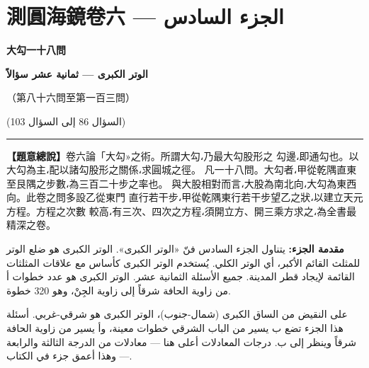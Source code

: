 \documentclass[11pt,a4paper]{article}
\newcommand{\ar}[1]{\arabicfont\beginR #1\endR}
\newcommand{\longline}{\noindent\rule{\textwidth}{0.4pt}}
\newcounter{probnum}
\begin{document}
\newpage

\setcounter{probnum}{0}

\section{測圓海鏡卷六 — \ar{الجزء السادس}}
\label{sec:vol6}

\begin{center}
{\Large\bfseries\color{volcolor} 大勾一十八問}

\vspace{0.2cm}

{\fontsize{14}{18}\selectfont\arabicfont\beginR\color{volcolor}\textbf{الوتر الكبرى — ثمانية عشر سؤالاً}\endR}

\vspace{0.2cm}

{\small\color{notecolor} （第八十六問至第一百三問）}

{\small\color{notecolor}\arabicfont\beginR (السؤال 86 إلى السؤال 103)\endR}
\end{center}

\vspace{0.3cm}
\longline
\vspace{0.3cm}

\noindent
\begin{minipage}[t]{0.48\textwidth}
\textbf{【題意總說】}卷六論「大勾»之術。所謂大勾،乃最大勾股形之
勾邊،即通勾也。以大勾為主،配以諸勾股形之關係،求圓城之徑。
凡一十八問。大勾者،甲從乾隅直東至艮隅之步數،為三百二十步之率也。
與大股相對而言،大股為南北向،大勾為東西向。此卷之問多設乙從東門
直行若干步،甲從乾隅東行若干步望乙之狀،以建立天元方程。方程之次數
較高،有三次、四次之方程،須開立方、開三乘方求之،為全書最精深之卷。
\end{minipage}
\hfill
\begin{minipage}[t]{0.48\textwidth}
\arabicfont\beginR
\textbf{مقدمة الجزء:} يتناول الجزء السادس فنّ «الوتر الكبرى».
الوتر الكبرى هو ضلع الوتر للمثلث القائم الأكبر، أي الوتر الكلي.
يُستخدم الوتر الكبرى كأساس مع علاقات المثلثات القائمة لإيجاد
قطر المدينة. جميع الأسئلة الثمانية عشر. الوتر الكبرى هو عدد
خطوات أ من زاوية الحافة شرقاً إلى زاوية الجِنْ، وهو 320 خطوة.

على النقيض من الساق الكبرى (شمال-جنوب)، الوتر الكبرى هو شرقي-غربي.
أسئلة هذا الجزء تضع ب يسير من الباب الشرقي خطوات معينة، وأ
يسير من زاوية الحافة شرقاً وينظر إلى ب. درجات المعادلات أعلى
هنا — معادلات من الدرجة الثالثة والرابعة — وهذا أعمق جزء في الكتاب.
\endR
\end{minipage}
\end{document}
